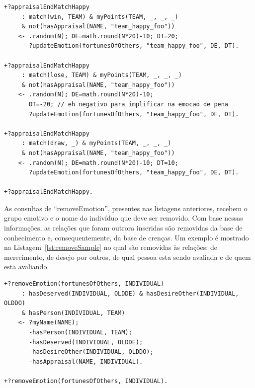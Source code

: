 \begin{center}
    \begin{minipage}{140mm}
	\lstset{linewidth=140mm}
	\begin{lstlisting}[frame=trbl,
caption=Parte do código do agente referente à avaliação do final do jogo para
as emoções relacionadas com a consequência de eventos para outros,
label=lst:soccerEnd2]
+?appraisalEndMatchHappy
     : match(win, TEAM) & myPoints(TEAM, _, _, _)
     & not(hasAppraisal(NAME, "team_happy_foo"))
    <- .random(N); DE=math.round(N*20)-10; DT=20;
       ?updateEmotion(fortunesOfOthers, "team_happy_foo", DE, DT).

+?appraisalEndMatchHappy
     : match(lose, TEAM) & myPoints(TEAM, _, _, _)
     & not(hasAppraisal(NAME, "team_happy_foo"))
    <- .random(N); DE=math.round(N*20)-10;
       DT=-20; // eh negativo para implificar na emocao de pena
       ?updateEmotion(fortunesOfOthers, "team_happy_foo", DE, DT).

+?appraisalEndMatchHappy
     : match(draw, _) & myPoints(TEAM, _, _, _)
     & not(hasAppraisal(NAME, "team_happy_foo"))
    <- .random(N); DE=math.round(N*20)-10; DT=10;
       ?updateEmotion(fortunesOfOthers, "team_happy_foo", DE, DT).

+?appraisalEndMatchHappy.
	\end{lstlisting}
    \end{minipage}
\end{center}

As consultas de ``removeEmotion'', presentes nas listagens anteriores, recebem
o grupo emotivo e o nome do indivíduo que deve ser removido. Com base nessas
informações, as relações que foram outrora inseridas são removidas da base de
conhecimento e, consequentemente, da base de crenças. Um exemplo é mostrado
na Listagem~\ref{lst:removeSample} no qual são removidas às relações: de
merecimento, de desejo por outros, de qual pessoa esta sendo avaliada e de
quem esta avaliando.

\begin{center}
    \begin{minipage}{130mm}
	\lstset{linewidth=130mm}
	\begin{lstlisting}[frame=trbl,
caption=Amostra de remoção de emoção do tipo destino de outros,
label=lst:removeSample]
+?removeEmotion(fortunesOfOthers, INDIVIDUAL)
     : hasDeserved(INDIVIDUAL, OLDDE) & hasDesireOther(INDIVIDUAL, OLDDO)
     & hasPerson(INDIVIDUAL, TEAM)
    <- ?myName(NAME);
       -hasPerson(INDIVIDUAL, TEAM);
       -hasDeserved(INDIVIDUAL, OLDDE);
       -hasDesireOther(INDIVIDUAL, OLDDO);
       -hasAppraisal(NAME, INDIVIDUAL).

+?removeEmotion(fortunesOfOthers, INDIVIDUAL).
	\end{lstlisting}
    \end{minipage}
\end{center}

